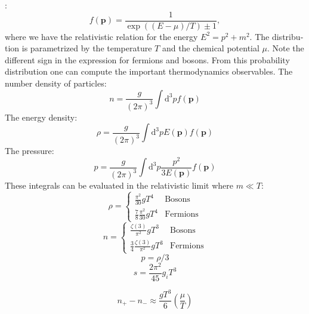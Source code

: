 \documentclass[master,       %
               twoside,        %
               BCOR10mm,       %
               english,ngerman, %
               ]{GAUBM}
\begin{document}
\begin{otherlanguage}{english}
{}:
\begin{equation}
	f(\mathbf{p}) = \frac{1}{\exp((E - \mu) / T) \pm 1},
\end{equation}
where we have the relativistic relation for the energy $E^2 = p^2 + m^2$. The distribution is parametrized by the temperature $T$ and the chemical potential $\mu$.
Note the different sign in the expression for fermions and bosons.
From this probability distribution one can compute the important thermodynamics observables.
The number density of particles:
\begin{equation}
	n = \frac{g}{(2\pi)^3} \int \mathrm{d}^3 p f(\mathbf{p})
\end{equation}
The energy density:
\begin{equation}
	\rho = \frac{g}{(2\pi)^3} \int \mathrm{d}^3 p E(\mathbf{p}) f(\mathbf{p})
\end{equation}
The pressure:
\begin{equation}
	p = \frac{g}{(2\pi)^3} \int \mathrm{d}^3 p \frac{p^2}{3E(\mathbf{p})} f(\mathbf{p})
\end{equation}
These integrals can be evaluated in the relativistic limit where $m \ll T$:
\begin{equation}
	\rho = \begin{cases}
		\frac{\pi^2}{30} g T^4 & \text{Bosons} \\
		\frac{7}{8} \frac{\pi^2}{30} g T^4 & \text{Fermions}
	\end{cases}
\end{equation}
\begin{equation}
	n = \begin{cases}
		\frac{\zeta(3)}{\pi^2} g T^3 & \text{Bosons} \\
		\frac{3}{4} \frac{\zeta(3)}{\pi^2} g T^3 & \text{Fermions}
	\end{cases}
\end{equation}
\begin{equation}
	p = \rho / 3
\end{equation}
\begin{equation}
	s = \frac{2 \pi^2}{45} g_i T^3
\end{equation}

\begin{equation}
	n_+ - n_- \approx \frac{g T^3}{6} \left( \frac{\mu}{T} \right)
\end{equation}


\end{otherlanguage}
\end{document}
